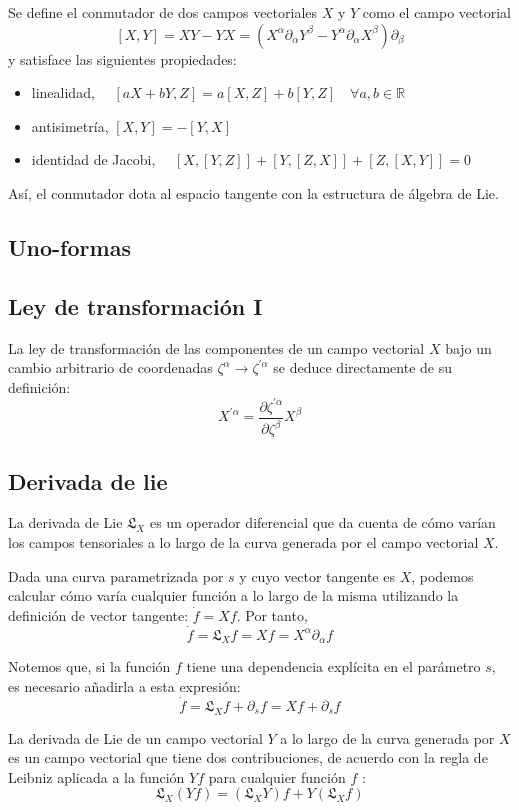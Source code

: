 Se define el conmutador de dos campos vectoriales $X$ y $Y$ como el campo vectorial
$$
[X, Y]=X Y-Y X=\left(X^{\alpha} \partial_{\alpha} Y^{\beta}-Y^{\alpha} \partial_{\alpha} X^{\beta}\right) \partial_{\beta}
$$
y satisface las siguientes propiedades:
\begin{itemize}
  \item linealidad, $\quad[a X+b Y, Z]=a[X, Z]+b[Y, Z] \quad \forall a, b \in \mathbb{R}$
  \item antisimetría, $[X, Y]=-[Y, X]$
  \item identidad de Jacobi, $\quad[X,[Y, Z]]+[Y,[Z, X]]+[Z,[X, Y]]=0$
\end{itemize}


Así, el conmutador dota al espacio tangente con la estructura de álgebra de Lie.
\subsection{Uno-formas}
\subsection{Ley de transformación I}
La ley de transformación de las componentes de un campo vectorial $X$ bajo un cambio arbitrario de coordenadas $\zeta^{\alpha} \rightarrow \zeta^{\prime \alpha}$ se deduce directamente de su definición:
$$
X^{\prime \alpha}=\frac{\partial \zeta^{\prime \alpha}}{\partial \zeta^{\beta}} X^{\beta}
$$
\subsection{Derivada de lie}
La derivada de Lie $\mathfrak{L}_{X}$ es un operador diferencial que da cuenta de cómo varían los campos tensoriales a lo largo de la curva generada por el campo vectorial $X$.

Dada una curva parametrizada por $s$ y cuyo vector tangente es $X$, podemos calcular cómo varía cualquier función a lo largo de la misma utilizando la definición de vector tangente: $\dot{f}=X f$. Por tanto,
$$
\dot{f}=\mathfrak{L}_{X} f=X f=X^{\alpha} \partial_{\alpha} f
$$

Notemos que, si la función $f$ tiene una dependencia explícita en el parámetro $s$, es necesario añadirla a esta expresión:
$$
\dot{f}=\mathfrak{L}_{X} f+\partial_{s} f=X f+\partial_{s} f
$$

La derivada de Lie de un campo vectorial $Y$ a lo largo de la curva generada por $X$ es un campo vectorial que tiene dos contribuciones, de acuerdo con la regla de Leibniz aplicada a la función $Y f$ para cualquier función $f$ :
$$
\mathfrak{L}_{X}(Y f)=\left(\mathfrak{L}_{X} Y\right) f+Y\left(\mathfrak{L}_{X} f\right)
$$

